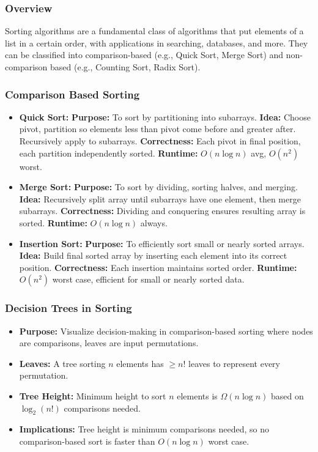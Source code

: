 \documentclass[landscape,7pt]{extarticle}
\begin{document}
\begin{multicols*}{3}
\subsubsection*{Overview}
Sorting algorithms are a fundamental class of algorithms that put elements of a list in a certain order, with applications in searching, databases, and more. They can be classified into comparison-based (e.g., Quick Sort, Merge Sort) and non-comparison based (e.g., Counting Sort, Radix Sort).

\subsubsection*{Comparison Based Sorting}
\begin{itemize}
\item \textbf{Quick Sort:} \textbf{Purpose:} To sort by partitioning into subarrays. \textbf{Idea:} Choose pivot, partition so elements less than pivot come before and greater after. Recursively apply to subarrays. \textbf{Correctness:} Each pivot in final position, each partition independently sorted. \textbf{Runtime:} $O(n \log n)$ avg, $O(n^2)$ worst.
\item \textbf{Merge Sort:} \textbf{Purpose:} To sort by dividing, sorting halves, and merging. \textbf{Idea:} Recursively split array until subarrays have one element, then merge subarrays. \textbf{Correctness:} Dividing and conquering ensures resulting array is sorted. \textbf{Runtime:} $O(n \log n)$ always.
\item \textbf{Insertion Sort:} \textbf{Purpose:} To efficiently sort small or nearly sorted arrays. \textbf{Idea:} Build final sorted array by inserting each element into its correct position. \textbf{Correctness:} Each insertion maintains sorted order. \textbf{Runtime:} $O(n^2)$ worst case, efficient for small or nearly sorted data.
\end{itemize}

\subsubsection*{Decision Trees in Sorting}
\begin{itemize}
\item \textbf{Purpose:} Visualize decision-making in comparison-based sorting where nodes are comparisons, leaves are input permutations.
\item \textbf{Leaves:} A tree sorting $n$ elements has $\geq n!$ leaves to represent every permutation.
\item \textbf{Tree Height:} Minimum height to sort $n$ elements is $\Omega(n \log n)$ based on $\log_2(n!)$ comparisons needed.
\item \textbf{Implications:} Tree height is minimum comparisons needed, so no comparison-based sort is faster than $O(n \log n)$ worst case.
\end{itemize}


\end{multicols*}
\end{document}
